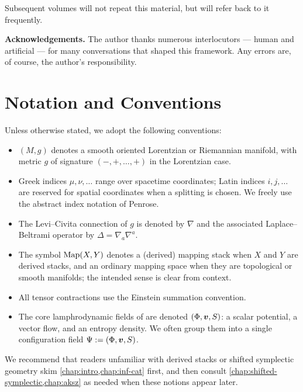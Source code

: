 \documentclass[11pt]{book}
\begin{document}
Subsequent volumes will not repeat this material, but will refer back to it
frequently.

\vspace{1em}
\noindent\textbf{Acknowledgements.} 
The author thanks numerous interlocutors --- human and artificial --- for
many conversations that shaped this framework. Any errors are, of course,
the author’s responsibility.

\tableofcontents

\chapter*{Notation and Conventions}

Unless otherwise stated, we adopt the following conventions:
\begin{itemize}
  \item $(M,g)$ denotes a smooth oriented Lorentzian or Riemannian manifold,
  with metric $g$ of signature $(-,+,\dots,+)$ in the Lorentzian case.

  \item Greek indices $\mu,\nu,\dots$ range over spacetime coordinates;
  Latin indices $i,j,\dots$ are reserved for spatial coordinates when a
  splitting is chosen. We freely use the abstract index notation of Penrose.

  \item The Levi--Civita connection of $g$ is denoted by $\nabla$ and the
  associated Laplace--Beltrami operator by $\Delta = \nabla_a\nabla^a$.

  \item The symbol $\operatorname{Map}(X,Y)$ denotes a (derived) mapping stack when $X$ and
  $Y$ are derived stacks, and an ordinary mapping space when they are topological
  or smooth manifolds; the intended sense is clear from context.

  \item All tensor contractions use the Einstein summation convention.

  \item The core lamphrodynamic fields of \rsvpabbr{} are denoted
  $(\Phi,\bm{v},S)$: a scalar potential, a vector flow, and an
  entropy density. We often group them into a single configuration field
  $\Psi := (\Phi,\bm{v},S)$.
\end{itemize}

We recommend that readers unfamiliar with derived stacks or shifted symplectic
geometry skim \cref{chap:intro,chap:inf-cat} first, and then consult
\cref{chap:shifted-symplectic,chap:aksz} as needed when these notions appear
later.
\end{document}
